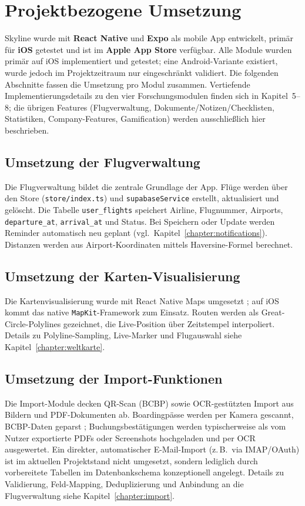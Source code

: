 \section{Projektbezogene Umsetzung}\label{sec:projektumsetzung}
Skyline wurde mit \textbf{React Native} und \textbf{Expo} als mobile App entwickelt, primär für \textbf{iOS} getestet und ist im \textbf{Apple App Store} verfügbar. Alle Module wurden primär auf iOS implementiert und getestet; eine
Android-Variante existiert, wurde jedoch im Projektzeitraum nur eingeschränkt validiert.
Die folgenden Abschnitte fassen die Umsetzung pro Modul zusammen. Vertiefende
Implementierungsdetails zu den vier Forschungsmodulen finden sich in Kapitel~5--8;
die übrigen Features (Flugverwaltung, Dokumente/Notizen/Checklisten, Statistiken,
Company-Features, Gamification) werden ausschließlich hier beschrieben.

\subsection{Umsetzung der Flugverwaltung}
Die Flugverwaltung bildet die zentrale Grundlage der App. Flüge werden über den
Store (\texttt{store/index.ts}) und \texttt{supabaseService} erstellt, aktualisiert
und gelöscht. Die Tabelle \texttt{user\_flights} speichert Airline, Flugnummer,
Airports, \texttt{departure\_at}, \texttt{arrival\_at} und Status. Bei Speichern
oder Update werden Reminder automatisch neu geplant (vgl.\ Kapitel~\ref{chapter:notifications}).
Distanzen werden aus Airport-Koordinaten mittels Haversine-Formel berechnet.

\subsection{Umsetzung der Karten-Visualisierung}
Die Kartenvisualisierung wurde mit React Native Maps umgesetzt \cite{reactNativeMaps};
auf iOS kommt das native \texttt{MapKit}-Framework zum Einsatz. Routen werden als
Great-Circle-Polylines gezeichnet, die Live-Position über Zeitstempel interpoliert.
Details zu Polyline-Sampling, Live-Marker und Flugauswahl siehe
Kapitel~\ref{chapter:weltkarte}.

\subsection{Umsetzung der Import-Funktionen}
Die Import-Module decken QR-Scan (BCBP) sowie OCR-gestützten Import aus Bildern
und PDF-Dokumenten ab. Boardingpässe werden per Kamera gescannt, BCBP-Daten
geparst \cite{iataBCBP}; Buchungsbestätigungen werden typischerweise als vom
Nutzer exportierte PDFs oder Screenshots hochgeladen und per OCR ausgewertet.
Ein direkter, automatischer E-Mail-Import (z.\,B.\ via IMAP/OAuth) ist im
aktuellen Projektstand nicht umgesetzt, sondern lediglich durch vorbereitete
Tabellen im Datenbankschema konzeptionell angelegt. Details zu Validierung,
Feld-Mapping, Deduplizierung und Anbindung an die Flugverwaltung siehe
Kapitel~\ref{chapter:import}.

